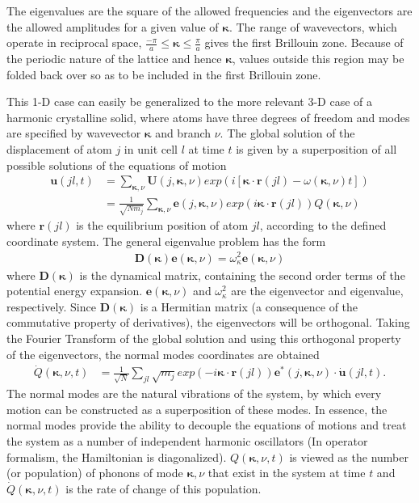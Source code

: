 \documentclass{article}
\begin{document}
The eigenvalues are the square of the allowed frequencies and the eigenvectors are the allowed amplitudes for a given value of $\pmb{\kappa}$. The range of wavevectors, which operate in reciprocal space,  $\frac{-\pi}{a}\leq \pmb{\kappa}\leq\frac{\pi}{a}$ gives the first Brillouin zone. Because of the periodic nature of the lattice and hence $\pmb{\kappa}$, values outside this region may be folded back over so as to be included in the first Brillouin zone.

This 1-D case can easily be generalized to the more relevant 3-D case of a harmonic crystalline solid, where atoms have three degrees of freedom and modes are specified by wavevector $\pmb{\kappa}$ and branch $\nu$. The global solution of the displacement of atom $j$ in unit cell $l$ at time $t$ is given by a superposition of all possible solutions of the equations of motion
\begin{eqnarray}
\pmb{u}(jl,t)&=\sum_{\pmb{\kappa},\nu}\pmb{U}(j,\pmb{\kappa},\nu)exp(i[\pmb{\kappa} \cdot \pmb{r}(jl)-\omega(\pmb{\kappa},\nu)t])\\
&=\frac{1}{\sqrt{Nm_j}}\sum_{\pmb{\kappa},\nu}\pmb{e}(j,\pmb{\kappa},\nu)exp(i\pmb{\kappa}\cdot\pmb{r}(jl))Q(\pmb{\kappa},\nu)
\end{eqnarray}
where $\pmb{r}(jl)$ is the equilibrium position of atom $jl$, according to the defined coordinate system. The general eigenvalue problem has the form
\begin{eqnarray}
\pmb{D}(\pmb{\kappa})\pmb{e}(\pmb{\kappa},\nu)=\omega^2_{\kappa}\pmb{e}(\pmb{\kappa},\nu)
\end{eqnarray}
where $\pmb{D}(\pmb{\kappa})$ is the dynamical matrix, containing the second order terms of the potential energy expansion. $\pmb{e}(\pmb{\kappa},\nu)$ and $\omega^2_{\kappa}$ are the eigenvector and eigenvalue, respectively. Since $\pmb{D}(\pmb{\kappa})$ is a Hermitian matrix (a consequence of the commutative property of derivatives), the eigenvectors will be orthogonal. Taking the Fourier Transform of the global solution and using this orthogonal property of the eigenvectors, the normal modes coordinates are obtained
\begin{eqnarray}
\dot{Q}(\pmb{\kappa},\nu,t)&=\frac{1}{\sqrt{N}}\sum_{jl}\sqrt{m_j}exp(-i\pmb{\kappa}\cdot\pmb{r}(jl))\pmb{e}^*(j,\pmb{\kappa},\nu)\cdot\dot{\pmb{u}}(jl,t).
\end{eqnarray}
The normal modes are the natural vibrations of the system, by which every motion can be constructed as a superposition of these modes. In essence, the normal modes provide the ability to decouple the equations of motions and treat the system as a number of independent harmonic oscillators (In operator formalism, the Hamiltonian is diagonalized). ${Q}(\pmb{\kappa},\nu,t)$ is viewed as the number (or population) of phonons of mode $\pmb{\kappa},\nu$ that exist in the system at time $t$ and $\dot{Q}(\pmb{\kappa},\nu,t)$ is the rate of change of this population. 
\end{document}
